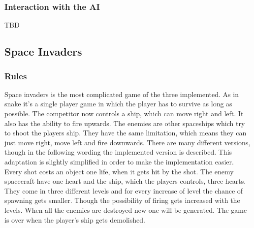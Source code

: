 \documentclass[12pt]{article}
\begin{document}
\subsubsection{Interaction with the AI}
TBD
\subsection{Space Invaders}
\subsubsection{Rules}
Space invaders is the most complicated game of the three implemented. As in snake it's a single player game in which the player has to survive as long as possible. The competitor now controls a ship, which can move right and left. It also has the ability to fire upwards. The enemies are other spaceships which try to shoot the players ship. They have the same limitation, which means they can just move right, move left and fire downwards. There are many different versions, though in the following wording the implemented version is described. This adaptation is slightly simplified in order to make the implementation easier. Every shot costs an object one life, when it gets hit by the shot. The enemy spacecraft have one heart and the ship, which the players controls, three hearts. They come in three different levels and for every increase of level the chance of spawning gets smaller. Though the possibility of firing gets increased with the levels. When all the enemies are destroyed new one will be generated. The game is over when the player's ship gets demolished.
\end{document}
